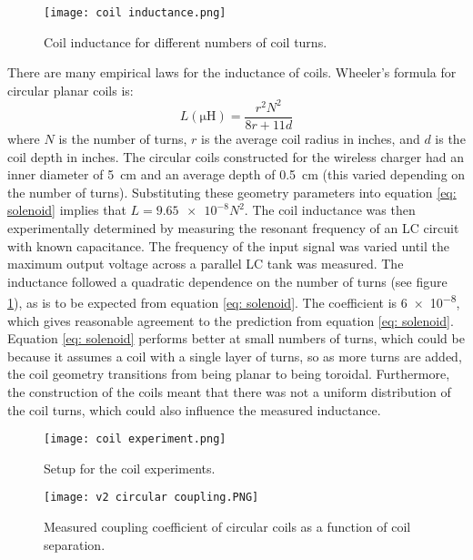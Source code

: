 \begin{figure}[htb]
	\centering
	\texttt{[image: coil inductance.png]}
	\caption{Coil inductance for different numbers of coil turns.}
	\label{fig: coil inductance}
\end{figure}

There are many empirical laws for the inductance of coils. Wheeler's formula \cite{Wheeler} for circular planar coils is:
\begin{equation}\label{eq: solenoid}
L (\si{\micro\henry})= \frac{r^2N^2}{8r + 11d}
\end{equation}
where $N$ is the number of turns, $r$ is the average coil radius in inches, and $d$ is the coil depth in inches. The circular coils constructed for the wireless charger had an inner diameter of \SI{5}{\centi\metre} and an average depth of \SI{0.5}{\centi\metre} (this varied depending on the number of turns). Substituting these geometry parameters into equation \ref{eq: solenoid} implies that $L=\num{9.65e-8}N^2$. The coil inductance was then experimentally determined by measuring the resonant frequency of an LC circuit with known capacitance. The frequency of the input signal was varied until the maximum output voltage across a parallel LC tank was measured. The inductance followed a quadratic dependence on the number of turns (see figure \ref{fig: coil inductance}), as is to be expected from equation \ref{eq: solenoid}. The coefficient is \num{6e-8}, which gives reasonable agreement to the prediction from equation \ref{eq: solenoid}. Equation \ref{eq: solenoid} performs better at small numbers of turns, which could be because it assumes a coil with a single layer of turns, so as more turns are added, the coil geometry transitions from being planar to being toroidal. Furthermore, the construction of the coils meant that there was not a uniform distribution of the coil turns, which could also influence the measured inductance.\\

\begin{figure}[htb]
	\centering
	\texttt{[image: coil experiment.png]}
	\caption{Setup for the coil experiments.}
	\label{fig: coil experiment setup}
\end{figure}
\begin{figure}[htb]
	\centering
	\texttt{[image: v2 circular coupling.PNG]}
	\caption{Measured coupling coefficient of circular coils as a function of coil separation.}
	\label{fig: circular coupling}
\end{figure}

